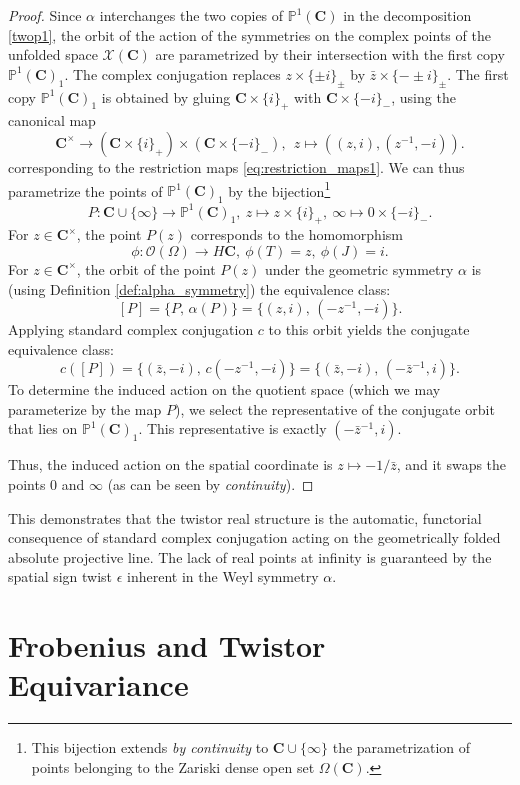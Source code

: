 \documentclass[11pt,a4paper]{article}
\newcommand{\C}{\mathbf{C}}
\renewcommand{\P}{\mathbb{P}}
\begin{document}
\begin{proof}
 Since $\alpha$ interchanges the two copies of $\P^1(\C)$ in   the decomposition \eqref{twop1}, the orbit of the action of the symmetries on the complex points of the unfolded space $\mathcal X(\C)$ are parametrized by their intersection with the first copy $\P^1(\C)_1$. 
The complex conjugation replaces $z\times \{\pm i\}_\pm$ by $\bar z\times \{-\pm i\}_\pm$. The first copy $\P^1(\C)_1$ is obtained by gluing
$
\C\times\{i\}_+$
with
$\C\times\{-i\}_-$, using the canonical map
\[
\C^\times \to \left(\C\times\{i\}_+\right)\times \left(\C\times\{-i\}_-\right), \  \ z\mapsto ((z,i),(z^{-1},-i)).
\]
corresponding to the restriction maps \eqref{eq:restriction_maps1}. We can thus parametrize the points of $\P^1(\C)_1$ by the bijection\footnote{This bijection extends \emph{by continuity} to $\C\cup\{\infty\}$ the parametrization of points belonging to the Zariski dense open set $\Omega(\C)$.}
\[
P:\C\cup \{\infty\}\to \P^1(\C)_1, \  z\mapsto z\times \{ i\}_+, \ \infty  \mapsto 0 \times  \{ -i\}_-.
\]
For $z\in \C^\times$, the point $P(z)$ corresponds to the homomorphism 
\[
\phi: \mathcal O(\Omega)\to H\C, \ \phi(T)=z, \ \phi(J)=i.
\]
For $z\in \C^\times$, the orbit of the point $P(z)$ under the geometric symmetry $\alpha$ is (using Definition \ref{def:alpha_symmetry}) the equivalence class:
\[
[P] = \big\{ P, \, \alpha(P) \big\} = \big\{ (z, i), \, (-z^{-1}, -i) \big\}.
\]
Applying standard complex conjugation $c$ to this orbit yields the conjugate equivalence class:
\[
c([P]) = \big\{ (\bar{z}, -i), \, c(-z^{-1}, -i) \big\} = \big\{ (\bar{z}, -i), \, (-\bar{z}^{-1}, i) \big\}.
\]
To determine the induced action on the quotient space (which we may parameterize by the map $P$), we select the representative of the conjugate orbit that lies on $\P^1(\C)_1$. This representative is exactly $(-\bar{z}^{-1}, i)$. 

Thus, the induced action on the spatial coordinate is $z \mapsto -1/\bar{z}$, and it swaps the points $0$ and $\infty$ (as can be seen by \emph{continuity}).
\end{proof}

This demonstrates that the twistor real structure  is the automatic, functorial consequence of standard complex conjugation acting on the geometrically folded absolute projective line. The lack of real points at infinity is  guaranteed by the spatial sign twist $\epsilon$ inherent in the Weyl symmetry $\alpha$.

\section{Frobenius and Twistor Equivariance}
\end{document}
